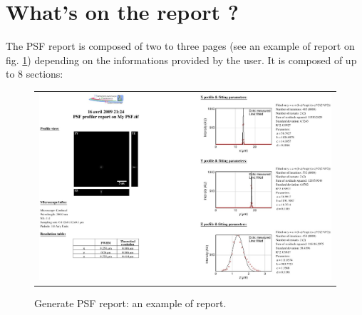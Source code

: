 \documentclass[a4paper, 11pt]{report}%
\begin{document}
\section{What's on the report ?}
\label{sec:gpr-rep}

The PSF report is composed of two to three pages (see an example of report on fig. \ref{fig:gpr-report}) depending on the informations provided by the user. It is composed of up to 8 sections:
\begin{figure}[!ht]
		\begin{center}
		\begin{tabular}{c}
			\includegraphics[width=\linewidth]{img/gpr-report}
		\end{tabular}
	\end{center}
	\caption{\label{fig:gpr-report}Generate PSF report: an example of report.}
\end{figure} 
\end{document}
